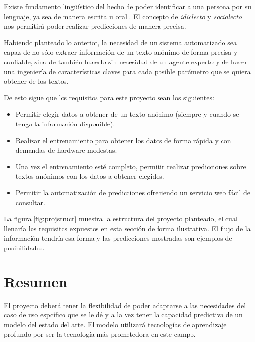 Existe fundamento lingüístico del hecho de poder identificar a una persona por su lenguaje, ya sea de manera escrita u oral \parencite{coulthard2004author, louwerse2004semantic}. El concepto de \textit{idiolecto} y \textit{sociolecto} nos permitirá poder realizar predicciones de manera precisa.

Habiendo planteado lo anterior, la necesidad de un sistema automatizado sea capaz de no sólo extraer información de un texto anónimo de forma precisa y confiable, sino de también hacerlo sin necesidad de un agente experto y de hacer una ingeniería de características claves para cada posible parámetro que se quiera obtener de los textos.

De esto sigue que los requisitos para este proyecto sean los siguientes:

\begin{itemize}
\item Permitir elegir datos a obtener de un texto anónimo (siempre y cuando se tenga la información disponible).
\item Realizar el entrenamiento para obtener los datos de forma rápida y con demandas de hardware modestas.
\item Una vez el entrenamiento esté completo, permitir realizar predicciones sobre textos anónimos con los datos a obtener elegidos.
\item Permitir la automatización de predicciones ofreciendo un servicio web fácil de consultar.
\end{itemize}

La figura \ref{fig:projstruct} muestra la estructura del proyecto planteado, el cual llenaría los requisitos expuestos en esta sección de forma ilustrativa. El flujo de la información tendría esa forma y las predicciones mostradas son ejemplos de posibilidades.

\section{Resumen}

El proyecto deberá tener la flexibilidad de poder adaptarse a las necesidades del caso de uso espcífico que se le dé y a la vez tener la capacidad predictiva de un modelo del estado del arte. El modelo utilizará tecnologías de aprendizaje profundo por ser la tecnología más prometedora en este campo.





